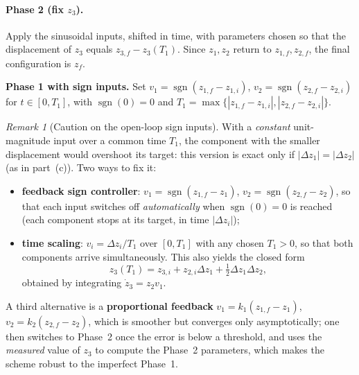 \documentclass[11pt,a4paper]{article}
\def\boldsymbol#1{#1}%
\DeclareMathOperator{\sgn}{sgn}
\newcommand{\z}{\boldsymbol{z}}
\theoremstyle{definition}
\theoremstyle{plain}
\theoremstyle{remark}
\newtheorem*{remark}{Remark}
\begin{document}
\paragraph{Phase 2 (fix $z_3$).} Apply the sinusoidal inputs, shifted in time, with parameters chosen so that the displacement of $z_3$ equals $z_{3,f}-z_3(T_1)$. Since $z_1,z_2$ return to $z_{1,f},z_{2,f}$, the final configuration is $\z_f$.

\medskip
\noindent\textbf{Phase 1 with sign inputs.} Set $v_1=\sgn(z_{1,f}-z_{1,i})$, $v_2=\sgn(z_{2,f}-z_{2,i})$ for $t\in[0,T_1]$, with $\sgn(0)=0$ and $T_1=\max\{|z_{1,f}-z_{1,i}|,|z_{2,f}-z_{2,i}|\}$.

\begin{remark}[Caution on the open-loop sign inputs]
With a \emph{constant} unit-magnitude input over a common time $T_1$, the component with the smaller displacement would overshoot its target: this version is exact only if $|\Delta z_1|=|\Delta z_2|$ (as in part~(c)). Two ways to fix it:
\begin{itemize}[nosep]
  \item \textbf{feedback sign controller}: $v_1=\sgn(z_{1,f}-z_1)$, $v_2=\sgn(z_{2,f}-z_2)$, so that each input switches off \emph{automatically} when $\sgn(0)=0$ is reached (each component stops at its target, in time $|\Delta z_i|$);
  \item \textbf{time scaling}: $v_i=\Delta z_i/T_1$ over $[0,T_1]$ with any chosen $T_1>0$, so that both components arrive simultaneously. This also yields the closed form
  \begin{equation}
     z_3(T_1)=z_{3,i}+z_{2,i}\Delta z_1+\tfrac12\Delta z_1\Delta z_2,
     \label{eq:z3T1}
  \end{equation}
  obtained by integrating $\dot z_3=z_2v_1$.
\end{itemize}
A third alternative is a \textbf{proportional feedback} $v_1=k_1(z_{1,f}-z_1)$, $v_2=k_2(z_{2,f}-z_2)$, which is smoother but converges only asymptotically; one then switches to Phase~2 once the error is below a threshold, and uses the \emph{measured} value of $z_3$ to compute the Phase~2 parameters, which makes the scheme robust to the imperfect Phase~1.
\end{remark}
\end{document}
